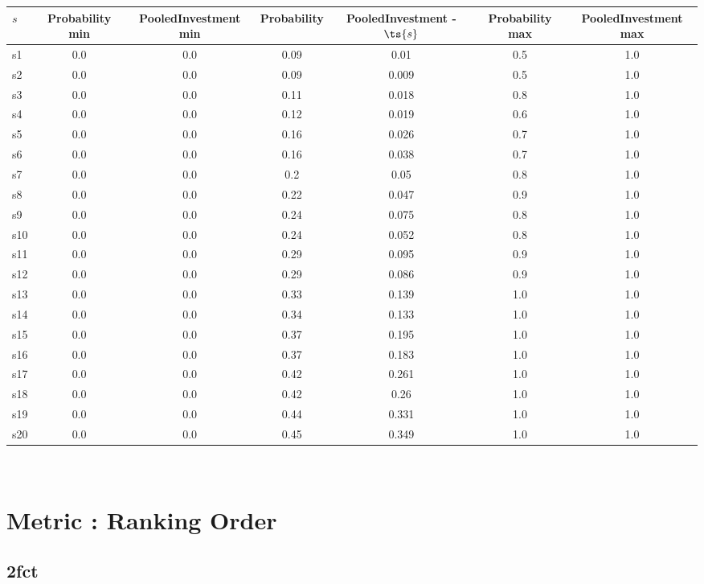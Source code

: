 \documentclass{article}
\begin{document}
\noindent\begin{tabular}{|l|c|c|c|c|c|c|}
\hline
$s$& Probability min & PooledInvestment min & Probability & PooledInvestment - $\ts{s}$ & Probability max & PooledInvestment max\\
\hline
s1 &0.0 & 0.0 & 0.09 & 0.01 & 0.5 & 1.0\\
\hline
s2 &0.0 & 0.0 & 0.09 & 0.009 & 0.5 & 1.0\\
\hline
s3 &0.0 & 0.0 & 0.11 & 0.018 & 0.8 & 1.0\\
\hline
s4 &0.0 & 0.0 & 0.12 & 0.019 & 0.6 & 1.0\\
\hline
s5 &0.0 & 0.0 & 0.16 & 0.026 & 0.7 & 1.0\\
\hline
s6 &0.0 & 0.0 & 0.16 & 0.038 & 0.7 & 1.0\\
\hline
s7 &0.0 & 0.0 & 0.2 & 0.05 & 0.8 & 1.0\\
\hline
s8 &0.0 & 0.0 & 0.22 & 0.047 & 0.9 & 1.0\\
\hline
s9 &0.0 & 0.0 & 0.24 & 0.075 & 0.8 & 1.0\\
\hline
s10 &0.0 & 0.0 & 0.24 & 0.052 & 0.8 & 1.0\\
\hline
s11 &0.0 & 0.0 & 0.29 & 0.095 & 0.9 & 1.0\\
\hline
s12 &0.0 & 0.0 & 0.29 & 0.086 & 0.9 & 1.0\\
\hline
s13 &0.0 & 0.0 & 0.33 & 0.139 & 1.0 & 1.0\\
\hline
s14 &0.0 & 0.0 & 0.34 & 0.133 & 1.0 & 1.0\\
\hline
s15 &0.0 & 0.0 & 0.37 & 0.195 & 1.0 & 1.0\\
\hline
s16 &0.0 & 0.0 & 0.37 & 0.183 & 1.0 & 1.0\\
\hline
s17 &0.0 & 0.0 & 0.42 & 0.261 & 1.0 & 1.0\\
\hline
s18 &0.0 & 0.0 & 0.42 & 0.26 & 1.0 & 1.0\\
\hline
s19 &0.0 & 0.0 & 0.44 & 0.331 & 1.0 & 1.0\\
\hline
s20 &0.0 & 0.0 & 0.45 & 0.349 & 1.0 & 1.0\\
\hline
\end{tabular}\\

\newpage
\section{Metric : Ranking Order}

\newpage

\subsection{2fct}
\end{document}

